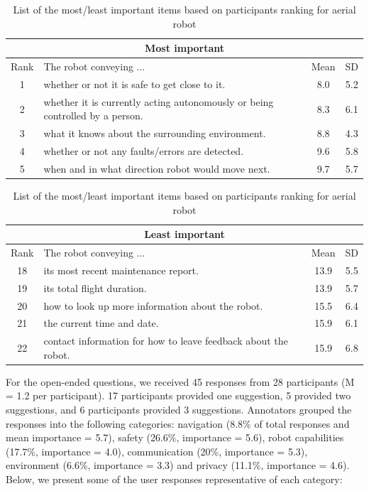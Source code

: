 \documentclass[letterpaper, 10 pt, conference]{ieeeconf}  %
\begin{document}
\begin {table}[h]
\begin{center}
\caption{List of the most/least important items based on participants ranking for aerial robot}
\vspace{1em}
\label{table:bebop}
\begin{tabular}{|c|p{150pt}|c|c|}
 \hline
 \multicolumn{4}{|c|}{Most important} \\
 \hline
 Rank & The robot conveying ... & Mean & SD \\
 \hline
 \rowcolor{Gray}
 1 & whether or not it is safe to get close to it. & 8.0 & 5.2\\
 \hline
 \rowcolor{Gray}
2 & whether it is currently acting autonomously or being controlled by a person. & 8.3 & 6.1\\
 \hline
 \rowcolor{Gray}
3 & what it knows about the surrounding environment. & 8.8 & 4.3\\
 \hline
4 & whether or not any faults/errors are detected. & 9.6 & 5.8\\
 \hline
5 & when and in what direction robot would move next. & 9.7 & 5.7\\
 \hline
\end{tabular}

\vspace*{0.5 cm}

\begin{tabular}{|c|p{150pt}|c|c|}
 \hline
  \multicolumn{4}{|c|}{Least important} \\
 \hline
 Rank & The robot conveying ... & Mean & SD \\
 \hline
18 & its most recent maintenance report. & 13.9 & 5.5 \\
 \hline
19 & its total flight duration. & 13.9 & 5.7 \\
 \hline
 \rowcolor{Gray}
20 & how to look up more information about the robot. & 15.5 & 6.4 \\
 \hline
 \rowcolor{Gray}
21 & the current time and date. & 15.9 & 6.1 \\
 \hline
 \rowcolor{Gray}
22 & contact information for how to leave feedback about the robot. & 15.9 & 6.8 \\
 \hline
 
\end{tabular}
\end{center}
\end{table}

For the open-ended questions, we received 45 responses from 28 participants (M = 1.2 per participant). 17 participants provided one suggestion, 5 provided two suggestions, and 6 participants provided 3 suggestions. Annotators grouped the responses into the following categories: navigation (8.8\% of total responses and mean importance = 5.7), safety (26.6\%, importance = 5.6), robot capabilities (17.7\%, importance = 4.0), communication (20\%, importance = 5.3), environment (6.6\%, importance = 3.3) and privacy (11.1\%, importance = 4.6). Below, we present some of the user responses representative of each category:
\end{document}

